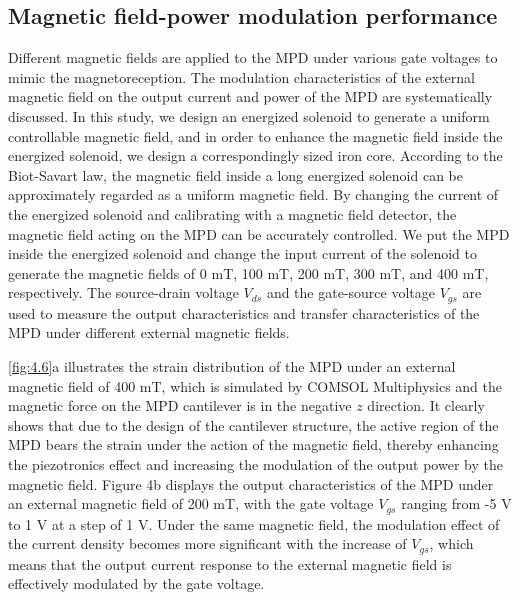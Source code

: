 \subsection{Magnetic field-power modulation performance}
\label{sec:Magnetic field-power modulation}

Different  magnetic fields  are applied to the MPD under various gate voltages  to mimic  the magnetoreception. The modulation  characteristics of the external magnetic field on the output current and power of the MPD are systematically discussed. In this study, we design an energized solenoid to generate a uniform controllable magnetic field, and in order to enhance the magnetic field inside the energized solenoid, we design a correspondingly sized iron core. According to the Biot-Savart law, the magnetic  field inside a long energized solenoid can be approximately regarded as a uniform magnetic field. By changing the current of the energized solenoid and calibrating with a magnetic field detector, the magnetic field acting on the MPD can be accurately controlled. We put the MPD inside the energized solenoid and change the input current of the solenoid to generate the magnetic fields of 0 \unit{\milli\tesla}, 100 \unit{\milli\tesla}, 200 \unit{\milli\tesla}, 300 \unit{\milli\tesla}, and 400 \unit{\milli\tesla}, respectively. The source-drain voltage  $V_{ds}$ and the gate-source voltage  $V_{gs}$ are used to measure the output characteristics and transfer characteristics of the MPD under different external magnetic fields.

\autoref{fig:4.6}a illustrates the strain  distribution of the MPD under an external magnetic field of 400 \unit{\milli\tesla}, which is simulated by COMSOL Multiphysics  and the magnetic force  on the MPD cantilever  is in the negative $z$ direction. It clearly shows that due to the design of the cantilever  structure, the active region  of the MPD bears the strain under the action of the magnetic field, thereby enhancing the piezotronics  effect and increasing the modulation of the output power by the magnetic field. Figure 4b displays the output characteristics of the MPD under an external magnetic field of 200 \unit{\milli\tesla}, with the gate voltage $V_{gs}$ ranging from -5 \unit{\V} to 1 \unit{\V} at a step of 1 \unit{\V}. Under the same magnetic field, the modulation effect of the current density becomes more significant with the increase of $V_{gs}$, which means that the  output current response to the external magnetic field is effectively modulated by the gate  voltage. 

